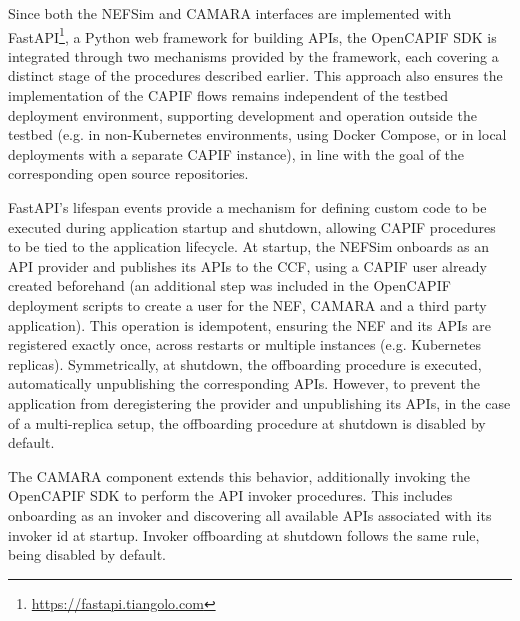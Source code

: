 Since both the \acs{NEF}Sim and CAMARA interfaces are implemented with Fast\acs{API}\footnote{\url{https://fastapi.tiangolo.com}}, a Python web framework for building \acsp{API}, the Open\acs{CAPIF} \acs{SDK} is integrated through two mechanisms provided by the framework, each covering a distinct stage of the procedures described earlier. This approach also ensures the implementation of the \acs{CAPIF} flows remains independent of the testbed deployment environment, supporting development and operation outside the testbed (e.g. in non-Kubernetes environments, using Docker Compose, or in local deployments with a separate \acs{CAPIF} instance), in line with the goal of the corresponding open source repositories. 

Fast\acs{API}'s lifespan events provide a mechanism for defining custom code to be executed during application startup and shutdown, allowing \acs{CAPIF} procedures to be tied to the application lifecycle. At startup, the \acs{NEF}Sim onboards as an \acs{API} provider and publishes its \acsp{API} to the \acs{CCF}, using a \acs{CAPIF} user already created beforehand (an additional step was included in the Open\acs{CAPIF} deployment scripts to create a user for the \acs{NEF}, CAMARA and a third party application). This operation is idempotent, ensuring the \acs{NEF} and its \acsp{API} are registered exactly once, across restarts or multiple instances (e.g. Kubernetes replicas). Symmetrically, at shutdown, the offboarding procedure is executed, automatically unpublishing the corresponding \acsp{API}. However, to prevent the application from deregistering the provider and unpublishing its \acsp{API}, in the case of a multi-replica setup, the offboarding procedure at shutdown is disabled by default.

The CAMARA component extends this behavior, additionally invoking the Open\acs{CAPIF} \acs{SDK} to perform the \acs{API} invoker procedures. This includes onboarding as an invoker and discovering all available \acsp{API} associated with its invoker id at startup. Invoker offboarding at shutdown follows the same rule, being disabled by default.

